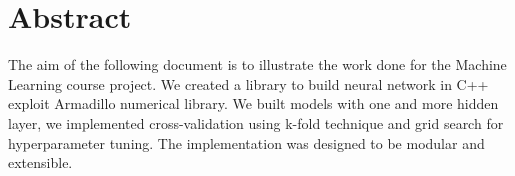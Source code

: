\section{Abstract}
The aim of the following document is to illustrate the work done for the Machine Learning course project. We created a library to build neural network in C++ exploit Armadillo numerical library. We built models with one and more hidden layer, we implemented cross-validation using k-fold technique and grid search for hyperparameter tuning. The implementation was designed to be modular and extensible.